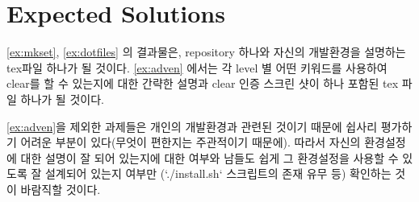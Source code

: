 \documentclass[a4paper, 11pt]{article}
\theoremstyle{definition}
\begin{document}
\section{Expected Solutions}

\cref{ex:mkset}, \cref{ex:dotfiles} 의 결과물은, repository 하나와
자신의 개발환경을 설명하는 tex파일 하나가 될 것이다. \cref{ex:adven}
에서는 각 level 별 어떤 키워드를 사용하여 clear를 할 수 있는지에 대한
간략한 설명과 clear 인증 스크린 샷이 하나 포함된 tex 파일 하나가 될 것이다.

\cref{ex:adven}을 제외한 과제들은 개인의 개발환경과 관련된 것이기 때문에
쉽사리 평가하기 어려운 부분이 있다(무엇이 편한지는 주관적이기 때문에).
따라서 자신의 환경설정에 대한 설명이 잘 되어 있는지에 대한 여부와
남들도 쉽게 그 환경설정을 사용할 수 있도록 잘 설계되어 있는지 여부만
(`./install.sh` 스크립트의 존재 유무 등) 확인하는 것이 바람직할 것이다.



\end{document}
